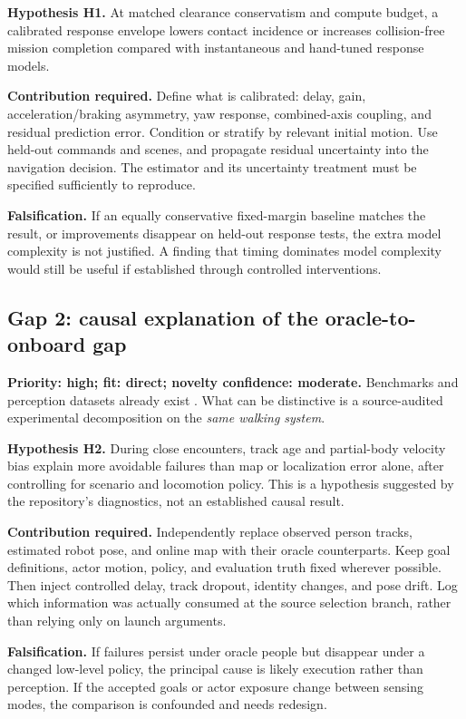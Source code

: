 \documentclass[11pt,a4paper]{article}
\begin{document}
\textbf{Hypothesis H1.} At matched clearance conservatism and compute budget,
a calibrated response envelope lowers contact incidence or increases
collision-free mission completion compared with instantaneous and
hand-tuned response models.

\textbf{Contribution required.} Define what is calibrated: delay, gain,
acceleration/braking asymmetry, yaw response, combined-axis coupling, and
residual prediction error. Condition or stratify by relevant initial motion.
Use held-out commands and scenes, and propagate residual uncertainty into
the navigation decision. The estimator and its uncertainty treatment must
be specified sufficiently to reproduce.

\textbf{Falsification.} If an equally conservative fixed-margin baseline
matches the result, or improvements disappear on held-out response tests,
the extra model complexity is not justified. A finding that timing dominates
model complexity would still be useful if established through controlled
interventions.

\subsection{Gap 2: causal explanation of the oracle-to-onboard gap}
\label{gap:causal}
\textbf{Priority: high; fit: direct; novelty confidence: moderate.}
Benchmarks and perception datasets already exist
\citep{socnavbench,jrdb,omninav}. What can be distinctive is a source-audited
experimental decomposition on the \emph{same walking system}.

\textbf{Hypothesis H2.} During close encounters, track age and partial-body
velocity bias explain more avoidable failures than map or localization
error alone, after controlling for scenario and locomotion policy.
This is a hypothesis suggested by the repository's diagnostics, not an
established causal result.

\textbf{Contribution required.} Independently replace observed person tracks,
estimated robot pose, and online map with their oracle counterparts. Keep
goal definitions, actor motion, policy, and evaluation truth fixed wherever
possible. Then inject controlled delay, track dropout, identity changes,
and pose drift. Log which information was actually consumed at the source
selection branch, rather than relying only on launch arguments.

\textbf{Falsification.} If failures persist under oracle people but disappear
under a changed low-level policy, the principal cause is likely execution
rather than perception. If the accepted goals or actor exposure change
between sensing modes, the comparison is confounded and needs redesign.
\end{document}

